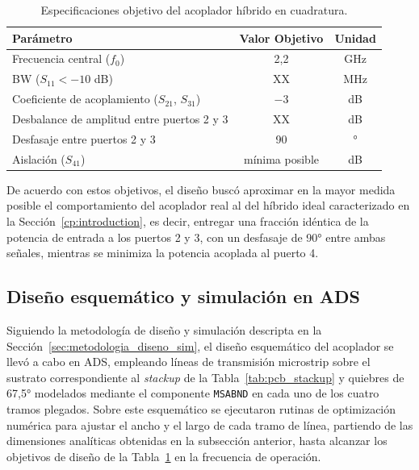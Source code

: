 \begin{table}[H]
    \centering
    \caption{Especificaciones objetivo del acoplador híbrido en cuadratura.}
    \label{tab:objetivos_acoplador}
    \begin{tabular}{lcc}
        \hline\hline
        \textbf{Parámetro}                               & \textbf{Valor Objetivo} & \textbf{Unidad} \\
        \hline
        Frecuencia central ($f_0$)                       & 2,2                     & GHz             \\
        BW ($S_{11} < -10$ dB)                           & XX                      & MHz             \\
        Coeficiente de acoplamiento ($S_{21}$, $S_{31}$) & $-3$                    & dB              \\
        Desbalance de amplitud entre puertos 2 y 3       & XX                      & dB              \\
        Desfasaje entre puertos 2 y 3                    & 90                      & °               \\
        Aislación ($S_{41}$)                             & mínima posible          & dB              \\
        \hline\hline
    \end{tabular}
\end{table}

De acuerdo con estos objetivos, el diseño buscó aproximar en la mayor medida posible el comportamiento del acoplador real al del híbrido ideal caracterizado en la Sección~\ref{cp:introduction}, es decir, entregar una fracción idéntica de la potencia de entrada a los puertos 2 y 3, con un desfasaje de 90° entre ambas señales, mientras se minimiza la potencia acoplada al puerto 4.

\subsection{Diseño esquemático y simulación en ADS}
Siguiendo la metodología de diseño y simulación descripta en la Sección~\ref{sec:metodologia_diseno_sim}, el diseño esquemático del acoplador se llevó a cabo en ADS, empleando líneas de transmisión microstrip sobre el sustrato correspondiente al \textit{stackup} de la Tabla~\ref{tab:pcb_stackup} y quiebres de 67,5° modelados mediante el componente \texttt{MSABND} en cada uno de los cuatro tramos plegados. Sobre este esquemático se ejecutaron rutinas de optimización numérica para ajustar el ancho y el largo de cada tramo de línea, partiendo de las dimensiones analíticas obtenidas en la subsección anterior, hasta alcanzar los objetivos de diseño de la Tabla~\ref{tab:objetivos_acoplador} en la frecuencia de operación.

